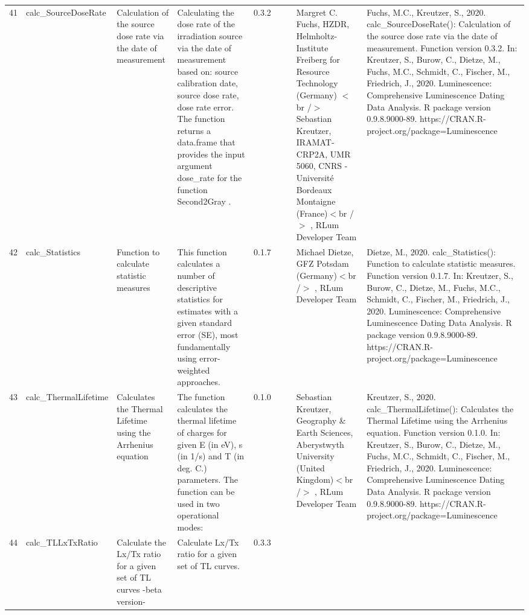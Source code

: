 \begin{table}[ht]
\begin{tabular}{rllllllll}
  41 & calc\_SourceDoseRate & Calculation of the source dose rate via the date of measurement & Calculating the dose rate of the irradiation source via the date of measurement based on: source calibration date, source dose rate, dose rate error. The function returns a data.frame that provides the input argument dose\_rate for the function  Second2Gray . & 0.3.2
 &  &  & Margret C. Fuchs, HZDR, Helmholtz-Institute Freiberg for Resource Technology (Germany)  $<$br /$>$ Sebastian Kreutzer, IRAMAT-CRP2A, UMR 5060, CNRS - Université Bordeaux Montaigne (France)$<$br /$>$ , RLum Developer Team & Fuchs, M.C., Kreutzer, S., 2020. calc\_SourceDoseRate(): Calculation of the source dose rate via the date of measurement. Function version 0.3.2. In: Kreutzer, S., Burow, C., Dietze, M., Fuchs, M.C., Schmidt, C., Fischer, M., Friedrich, J., 2020. Luminescence: Comprehensive Luminescence Dating Data Analysis. R package version 0.9.8.9000-89. https://CRAN.R-project.org/package=Luminescence
 \\ 
  42 & calc\_Statistics & Function to calculate statistic measures & This function calculates a number of descriptive statistics for estimates with a given standard error (SE), most fundamentally using error-weighted approaches. & 0.1.7
 &  &  & Michael Dietze, GFZ Potsdam (Germany)$<$br /$>$ , RLum Developer Team & Dietze, M., 2020. calc\_Statistics(): Function to calculate statistic measures. Function version 0.1.7. In: Kreutzer, S., Burow, C., Dietze, M., Fuchs, M.C., Schmidt, C., Fischer, M., Friedrich, J., 2020. Luminescence: Comprehensive Luminescence Dating Data Analysis. R package version 0.9.8.9000-89. https://CRAN.R-project.org/package=Luminescence
 \\ 
  43 & calc\_ThermalLifetime & Calculates the Thermal Lifetime using the Arrhenius equation & The function calculates the thermal lifetime of charges for given E (in eV), s (in 1/s) and T (in deg. C.) parameters. The function can be used in two operational modes: & 0.1.0
 &  &  & Sebastian Kreutzer, Geography \& Earth Sciences, Aberystwyth University (United Kingdom)$<$br /$>$ , RLum Developer Team & Kreutzer, S., 2020. calc\_ThermalLifetime(): Calculates the Thermal Lifetime using the Arrhenius equation. Function version 0.1.0. In: Kreutzer, S., Burow, C., Dietze, M., Fuchs, M.C., Schmidt, C., Fischer, M., Friedrich, J., 2020. Luminescence: Comprehensive Luminescence Dating Data Analysis. R package version 0.9.8.9000-89. https://CRAN.R-project.org/package=Luminescence
 \\ 
  44 & calc\_TLLxTxRatio & Calculate the Lx/Tx ratio for a given set of TL curves -beta version- & Calculate Lx/Tx ratio for a given set of TL curves. & 0.3.3

\end{tabular}
\end{table}
